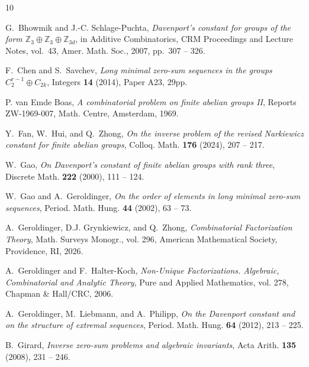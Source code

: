 \documentclass[a4paper, 10pt]{amsart}
\theoremstyle{plain}
\theoremstyle{definition}
\numberwithin{equation}{section}
\begin{document}
{\providecommand{\bysame}{\leavevmode\hbox to3em{\hrulefill}\thinspace}
\providecommand{\MR}{\relax\ifhmode\unskip\space\fi MR }
\providecommand{\MRhref}[2]{%
  \href{http://www.ams.org/mathscinet-getitem?mr=#1}{#2}
}
\providecommand{\href}[2]{#2}
\begin{thebibliography}{10}

G.~Bhowmik and J.-C. Schlage-Puchta, \emph{Davenport's constant for groups of
  the form $\mathbb{Z}_3 \oplus \mathbb{Z}_3 \oplus \mathbb{Z}_{3d}$}, in
  Additive Combinatorics, CRM Proceedings and Lecture Notes, vol.~43, Amer.
  {M}ath. {S}oc., 2007, pp.~307 -- 326.

F.~Chen and S.~Savchev, \emph{Long minimal zero-sum sequences in the groups
  ${C}_2^{r-1} \oplus {C}_{2k}$}, Integers \textbf{14} (2014), Paper A23, 29pp.

{P. van} {Emde Boas}, \emph{A combinatorial problem on finite abelian groups
  {II}}, Reports ZW-1969-007, Math. Centre, Amsterdam, 1969.

Y.~Fan, W.~Hui, and Q.~Zhong, \emph{On the inverse problem of the revised
  {N}arkiewicz constant for finite abelian groups}, Colloq. Math. \textbf{176}
  (2024), 207 -- 217.

W.~Gao, \emph{On {D}avenport's constant of finite abelian groups with rank
  three}, Discrete Math. \textbf{222} (2000), 111 -- 124.

W.~Gao and A.~Geroldinger, \emph{On the order of elements in long minimal
  zero-sum sequences}, Period. Math. Hung. \textbf{44} (2002), 63 -- 73.

A.~Geroldinger, D.J. Grynkiewicz, and Q.~Zhong, \emph{Combinatorial
  {F}actorization {T}heory}, Math. Surveys Monogr., vol. 296, American
  Mathematical Society, Providence, RI, 2026.

A.~Geroldinger and F.~Halter-Koch, \emph{Non-{U}nique {F}actorizations.
  {A}lgebraic, {C}ombinatorial and {A}nalytic {T}heory}, Pure and Applied
  Mathematics, vol. 278, Chapman \& Hall/CRC, 2006.

A.~Geroldinger, M.~Liebmann, and A.~Philipp, \emph{On the {D}avenport constant
  and on the structure of extremal sequences}, Period. Math. Hung. \textbf{64}
  (2012), 213 -- 225.

B.~Girard, \emph{Inverse zero-sum problems and algebraic invariants}, Acta
  Arith. \textbf{135} (2008), 231 -- 246.


\end{thebibliography}}
\end{document}
